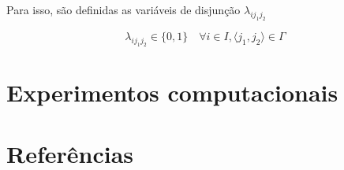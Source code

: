 \documentclass[]{article}
\newif\ifartigo
\begin{document}
 			Para isso, são definidas as variáveis de disjunção $\lambda_{ij_1j_2}$
 			
 			\begin{equation}
 				\label{cflp:ms:ci:dom:var}		
 				\lambda_{ij_1j_2} \in \{ 0, 1 \}	
 				\quad
 				\forall i \in I, \langle j_1, j_2 \rangle \in \Gamma	
 			\end{equation}
\fi

		 
	\section{Experimentos computacionais}
	
		
		
		

	\vfill
	\section{Referências}
		
		
\ifartigo		
	\vfill
	\section{Tabelas}
	\newpage
		
		
		
		
		
\fi		
\end{document}
